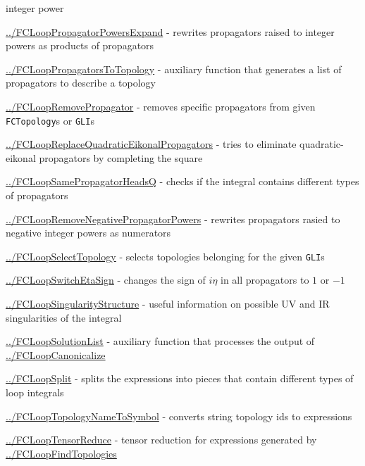 \documentclass[../FeynCalcManual.tex]{subfiles}
\begin{document}
\begin{itemize}
{  integer power
\item
  \hyperlink{../fclooppropagatorpowersexpand}{../FCLoopPropagatorPowersExpand}
  - rewrites propagators raised to integer powers as products of
  propagators
\item
  \hyperlink{../fclooppropagatorstotopology}{../FCLoopPropagatorsToTopology}
  - auxiliary function that generates a list of propagators to describe
  a topology
\item
  \hyperlink{../fcloopremovepropagator}{../FCLoopRemovePropagator} -
  removes specific propagators from given \texttt{FCTopology}s or
  \texttt{GLI}s
\item
  \hyperlink{../fcloopreplacequadraticeikonalpropagators}{../FCLoopReplaceQuadraticEikonalPropagators}
  - tries to eliminate quadratic-eikonal propagators by completing the
  square
\item
  \hyperlink{../fcloopsamepropagatorheadsq}{../FCLoopSamePropagatorHeadsQ}
  - checks if the integral contains different types of propagators
\item
  \hyperlink{../fcloopremovenegativepropagatorpowers}{../FCLoopRemoveNegativePropagatorPowers}
  - rewrites propagators rasied to negative integer powers as numerators
\item
  \hyperlink{../fcloopselecttopology}{../FCLoopSelectTopology} - selects
  topologies belonging for the given \texttt{GLI}s
\item
  \hyperlink{../fcloopswitchetasign}{../FCLoopSwitchEtaSign} - changes
  the sign of \(i \eta\) in all propagators to \(1\) or \(-1\)
\item
  \hyperlink{../fcloopsingularitystructure}{../FCLoopSingularityStructure}
  - useful information on possible UV and IR singularities of the
  integral
\item
  \hyperlink{../fcloopsolutionlist}{../FCLoopSolutionList} - auxiliary
  function that processes the output of
  \hyperlink{../fcloopcanonicalize}{../FCLoopCanonicalize}
\item
  \hyperlink{../fcloopsplit}{../FCLoopSplit} - splits the expressions
  into pieces that contain different types of loop integrals
\item
  \hyperlink{../fclooptopologynametosymbol}{../FCLoopTopologyNameToSymbol}
  - converts string topology ids to expressions
\item
  \hyperlink{../fclooptensorreduce}{../FCLoopTensorReduce} - tensor
  reduction for expressions generated by
  \hyperlink{../fcloopfindtopologies}{../FCLoopFindTopologies}
\item
}
\end{itemize}
\end{document}
